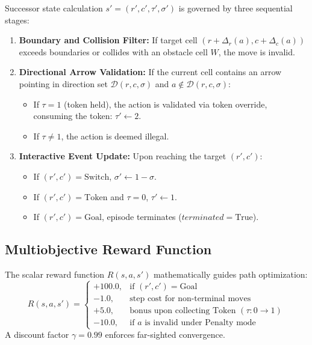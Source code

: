 \documentclass[conference]{IEEEtran}
\begin{document}
Successor state calculation $s' = (r', c', \tau', \sigma')$ is governed by three sequential stages:
\begin{enumerate}
    \item \textbf{Boundary and Collision Filter:} If target cell $(r + \Delta_r(a), c + \Delta_c(a))$ exceeds boundaries or collides with an obstacle cell $W$, the move is invalid.
    \item \textbf{Directional Arrow Validation:} If the current cell contains an arrow pointing in direction set $\mathcal{D}(r, c, \sigma)$ and $a \notin \mathcal{D}(r, c, \sigma)$:
    \begin{itemize}
        \item If $\tau = 1$ (token held), the action is validated via token override, consuming the token: $\tau' \leftarrow 2$.
        \item If $\tau \neq 1$, the action is deemed illegal.
    \end{itemize}
    \item \textbf{Interactive Event Update:} Upon reaching the target $(r', c')$:
    \begin{itemize}
        \item If $(r', c') = \text{Switch}$, $\sigma' \leftarrow 1 - \sigma$.
        \item If $(r', c') = \text{Token}$ and $\tau = 0$, $\tau' \leftarrow 1$.
        \item If $(r', c') = \text{Goal}$, episode terminates ($terminated = \text{True}$).
    \end{itemize}
\end{enumerate}

\subsection{Multiobjective Reward Function}
The scalar reward function $R(s, a, s')$ mathematically guides path optimization:
\begin{equation}
R(s, a, s') = 
\begin{cases}
+100.0, & \text{if } (r', c') = \text{Goal} \\
-1.0, & \text{step cost for non-terminal moves} \\
+5.0, & \text{bonus upon collecting Token } (\tau: 0 \to 1) \\
-10.0, & \text{if } a \text{ is invalid under Penalty mode}
\end{cases}
\end{equation}
A discount factor $\gamma = 0.99$ enforces far-sighted convergence.
\end{document}
